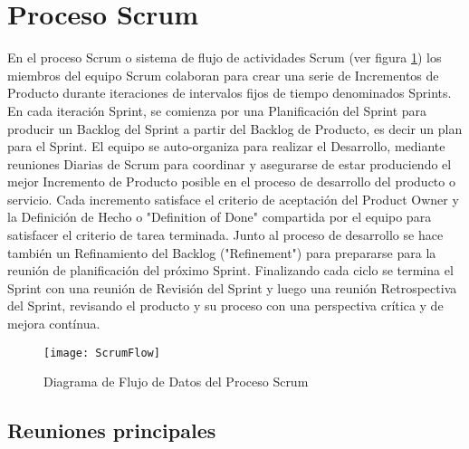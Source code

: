\section{Proceso Scrum}

En el proceso Scrum o sistema de flujo de actividades Scrum (ver figura \ref{fig:ScrumFlow}) los miembros del equipo Scrum colaboran para crear una serie de Incrementos de Producto durante iteraciones de intervalos fijos de tiempo denominados Sprints. En cada iteración Sprint, se comienza por una Planificación del Sprint para producir un Backlog del Sprint a partir del Backlog de Producto, es decir un plan para el Sprint. El equipo se auto-organiza para realizar el Desarrollo, mediante reuniones Diarias de Scrum para coordinar y asegurarse de estar produciendo el mejor Incremento de Producto posible en el proceso de desarrollo del producto o servicio. Cada incremento satisface el criterio de aceptación del Product Owner y la Definición de Hecho o "Definition of Done" compartida por el equipo para satisfacer el criterio de tarea terminada. Junto al proceso de desarrollo se hace también un Refinamiento del Backlog ("Refinement") para prepararse para la reunión de planificación del próximo Sprint. Finalizando cada ciclo se termina el Sprint con una reunión de Revisión del Sprint y luego una reunión Retrospectiva del Sprint, revisando el producto y su proceso con una perspectiva crítica y de mejora contínua. 

\begin{figure}[h]
  \centering
  \texttt{[image: ScrumFlow]}
  \caption{Diagrama de Flujo de Datos del Proceso Scrum}
  \centering
  \label{fig:ScrumFlow} %
\end{figure}

\subsection{Reuniones principales}

